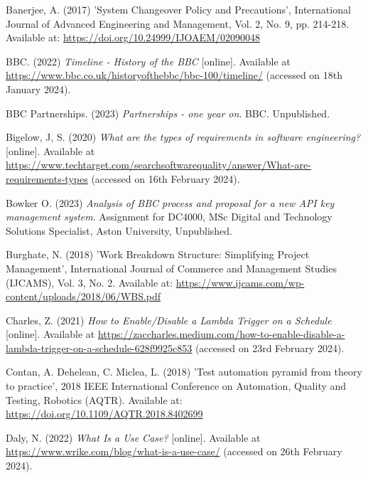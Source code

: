 \noindent Banerjee, A. (2017) 'System Changeover Policy and Precautions', International Journal of Advanced Engineering and Management, Vol. 2, No. 9, pp. 214-218. Available at: \url{https://doi.org/10.24999/IJOAEM/02090048}
\vspace{0.2cm}

\noindent BBC. (2022) \textit{Timeline - History of the BBC} [online]. Available at \url{https://www.bbc.co.uk/historyofthebbc/bbc-100/timeline/} (accessed on 18th January 2024).
\vspace{0.2cm}

\noindent BBC Partnerships. (2023) \textit{Partnerships - one year on}. BBC. Unpublished.
\vspace{0.2cm}

\noindent Bigelow, J, S. (2020) \textit{What are the types of requirements in software engineering?} [online]. Available at \url{https://www.techtarget.com/searchsoftwarequality/answer/What-are-requirements-types} (accessed on 16th February 2024).
\vspace{0.2cm}

\noindent Bowker O. (2023) \textit{Analysis of BBC process and proposal for a new API key management system}. Assignment for DC4000, MSc Digital and Technology Solutions Specialist, Aston University, Unpublished.
\vspace{0.2cm}

\noindent Burghate, N. (2018) 'Work Breakdown Structure: Simplifying Project Management', International Journal of Commerce and Management Studies (IJCAMS), Vol. 3, No. 2. Available at: \url{https://www.ijcams.com/wp-content/uploads/2018/06/WBS.pdf}
\vspace{0.2cm}

\noindent Charles, Z. (2021) \textit{How to Enable/Disable a Lambda Trigger on a Schedule} [online]. Available at \url{https://zaccharles.medium.com/how-to-enable-disable-a-lambda-trigger-on-a-schedule-628f9925c853} (accessed on 23rd February 2024).
\vspace{0.2cm}

\noindent Contan, A. Dehelean, C. Miclea, L. (2018) 'Test automation pyramid from theory to practice', 2018 IEEE International Conference on Automation, Quality and Testing, Robotics (AQTR). Available at: \url{https://doi.org/10.1109/AQTR.2018.8402699}
\vspace{0.2cm}

\noindent Daly, N. (2022) \textit{What Is a Use Case?} [online]. Available at \url{https://www.wrike.com/blog/what-is-a-use-case/} (accessed on 26th February 2024).
\vspace{0.2cm}

